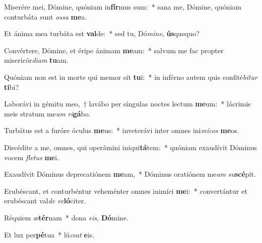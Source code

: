 \item Miserére mei, Dómine, quóniam in\textbf{fír}mus sum:~* sana me, Dómine, quóniam conturbáta sunt \textit{os}\textit{sa} \textbf{me}a.

\item Et ánima mea turbáta est \textbf{val}de:~* sed tu, Dó\textit{mi}\textit{ne}, \textbf{ús}quequo?

\item Convértere, Dómine, et éripe ánimam \textbf{me}am:~* salvum me fac propter misericór\textit{di}\textit{am} \textbf{tu}am.

\item Quóniam non est in morte qui memor sit \textbf{tu}i:~* in inférno autem quis confité\textit{bi}\textit{tur} \textbf{ti}bi?

\item Laborávi in gémitu meo,~† lavábo per síngulas noctes lectum \textbf{me}um:~* lácrimis meis stratum me\textit{um} \textit{ri}\textbf{gá}bo.

\item Turbátus est a furóre óculus \textbf{me}us:~* inveterávi inter omnes ini\textit{mí}\textit{cos} \textbf{me}os.

\item Discédite a me, omnes, qui operámini iniqui\textbf{tá}tem:~* quóniam exaudívit Dóminus vocem \textit{fle}\textit{tus} \textbf{me}i.

\item Exaudívit Dóminus deprecatiónem \textbf{me}am,~* Dóminus oratiónem me\textit{am} \textit{su}\textbf{scé}pit.

\item Erubéscant, et conturbéntur veheménter omnes inimíci \textbf{me}i:~* convertántur et erubéscant val\textit{de} \textit{ve}\textbf{ló}citer.

\item Réquiem æ\textbf{tér}nam~* dona \textit{e}\textit{is}, \textbf{Dó}mine.

\item Et lux per\textbf{pé}tua~* lú\textit{ce}\textit{at} \textbf{e}is.
